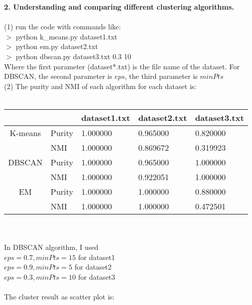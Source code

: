 \documentclass[11pt,a4paper,fleqn]{article}
\begin{document}
\textbf{2. Understanding and comparing different clustering algorithms.}\\ \\
(1) run the code with commands like:\\
$>$ python k\_means.py dataset1.txt\\
$>$ python em.py dataset2.txt\\
$>$ python dbscan.py dataset3.txt 0.3 10\\
Where the first parameter (dataset*.txt) is the file name of the dataset. For DBSCAN, the second parameter is $eps$, the third parameter is $minPts$\\
(2) The purity and NMI of each algorithm for each dataset is:\\ \\
\begin{tabular}{|c|l|l|l|l|}
\hline
&&dataset1.txt&dataset2.txt&dataset3.txt\\
\hline
K-means&Purity&1.000000&0.965000&0.820000\\
 &NMI&1.000000&0.869672&0.319923\\
\hline
DBSCAN&Purity&1.000000&0.965000&1.000000\\
 &NMI&1.000000&0.922051&1.000000\\
\hline
EM&Purity&1.000000&1.000000&0.880000\\
 &NMI&1.000000&1.000000&0.472501\\
\hline
\end{tabular}\\ \\
In DBSCAN algorithm, I used\\
$eps = 0.7, minPts = 15$ for dataset1\\
$eps = 0.9, minPts = 5$ for dataset2\\
$eps = 0.3, minPts = 10$ for dataset3\\ \\
The cluster result as scatter plot is:\\
\end{document}
